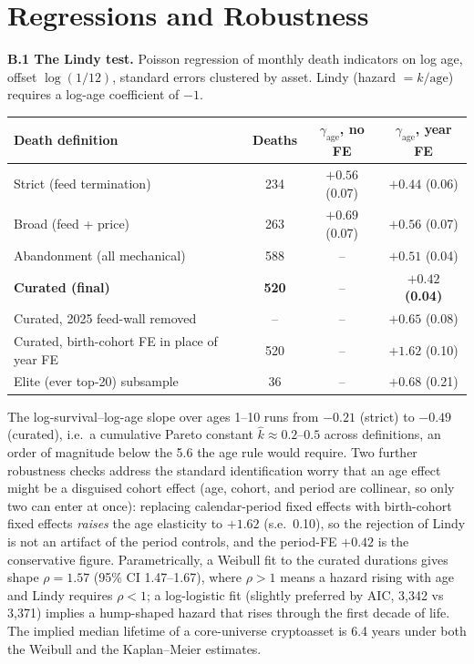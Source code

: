 \documentclass[11pt]{article}
\begin{document}
\section{Regressions and Robustness}

\textbf{B.1 The Lindy test.} Poisson regression of monthly death indicators on log age, offset $\log(1/12)$, standard errors clustered by asset. Lindy (hazard $= k/\text{age}$) requires a log-age coefficient of $-1$.

\begin{table}[ht]\centering\small
\begin{tabular}{lccc}
\toprule
Death definition & Deaths & $\gamma_{\text{age}}$, no FE & $\gamma_{\text{age}}$, year FE \\
\midrule
Strict (feed termination) & 234 & $+0.56$ (0.07) & $+0.44$ (0.06) \\
Broad (feed + price) & 263 & $+0.69$ (0.07) & $+0.56$ (0.07) \\
Abandonment (all mechanical) & 588 & -- & $+0.51$ (0.04) \\
\textbf{Curated (final)} & \textbf{520} & -- & $\boldsymbol{+0.42}$ \textbf{(0.04)} \\
Curated, 2025 feed-wall removed & -- & -- & $+0.65$ (0.08) \\
Curated, birth-cohort FE in place of year FE & 520 & -- & $+1.62$ (0.10) \\
Elite (ever top-20) subsample & 36 & -- & $+0.68$ (0.21) \\
\bottomrule
\end{tabular}
\end{table}

The log-survival--log-age slope over ages 1--10 runs from $-0.21$ (strict) to $-0.49$ (curated), i.e.\ a cumulative Pareto constant $\hat{k} \approx 0.2$--$0.5$ across definitions, an order of magnitude below the 5.6 the age rule would require. Two further robustness checks address the standard identification worry that an age effect might be a disguised cohort effect (age, cohort, and period are collinear, so only two can enter at once): replacing calendar-period fixed effects with birth-cohort fixed effects \emph{raises} the age elasticity to $+1.62$ (s.e.\ 0.10), so the rejection of Lindy is not an artifact of the period controls, and the period-FE $+0.42$ is the conservative figure. Parametrically, a Weibull fit to the curated durations gives shape $\rho = 1.57$ (95\% CI 1.47--1.67), where $\rho > 1$ means a hazard rising with age and Lindy requires $\rho < 1$; a log-logistic fit (slightly preferred by AIC, 3,342 vs 3,371) implies a hump-shaped hazard that rises through the first decade of life. The implied median lifetime of a core-universe cryptoasset is 6.4 years under both the Weibull and the Kaplan--Meier estimates.
\end{document}
